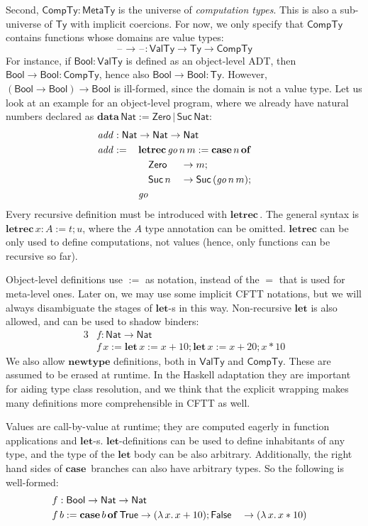 \documentclass[acmsmall,screen,review,anonymous]{acmart}
\newcommand{\mit}[1]{\mathit{#1}}
\newcommand{\msf}[1]{\mathsf{#1}}
\newcommand{\mbf}[1]{\mathbf{#1}}
\newcommand{\bs}[1]{\boldsymbol{#1}}
\newcommand{\ind}{\hspace{1em}}
\newcommand{\lam}{\lambda\,}
\newcommand{\data}{\mbf{data}\,}
\newcommand{\letrec}{\mbf{letrec}\,}
\newcommand{\of}{\mbf{of}\,}
\newcommand{\go}{\mit{go}}
\newcommand{\add}{\mit{add}}
\newcommand{\letdef}{\mbf{let\,}}
\newcommand{\Bool}{\msf{Bool}}
\newcommand{\case}{\mbf{case\,}}
\newcommand{\MTy}{\msf{MetaTy}}
\newcommand{\VTy}{\msf{ValTy}}
\newcommand{\Ty}{\msf{Ty}}
\newcommand{\CTy}{\msf{CompTy}}
\newcommand{\True}{\msf{True}}
\newcommand{\False}{\msf{False}}
\newcommand{\blank}{{\mathord{\hspace{1pt}\text{--}\hspace{1pt}}}}
\newcommand{\Nat}{\msf{Nat}}
\newcommand{\Zero}{\msf{Zero}}
\newcommand{\Suc}{\msf{Suc}}
\theoremstyle{remark}
\begin{document}
Second, $\bs{\CTy} : \MTy$ is the universe of \emph{computation types}. This is
also a sub-universe of $\Ty$ with implicit coercions. For now, we only specify
that $\CTy$ contains functions whose domains are value types:
\[ \blank\to\blank : \VTy \to \Ty \to \CTy \]
For instance, if $\Bool : \VTy$ is defined as an object-level ADT, then $\Bool
\to \Bool : \CTy$, hence also $\Bool \to \Bool : \Ty$. However, $(\Bool \to
\Bool) \to \Bool$ is ill-formed, since the domain is not a value type. Let us look at an
example for an object-level program, where we already have natural numbers
declared as $\data \Nat := \Zero\,|\,\Suc\,\Nat$:
\begin{alignat*}{3}
  &\hspace{-1em}\rlap{$\add : \Nat \to \Nat \to \Nat$}\\
  &\hspace{-1em}\add :=\,&& \mathrlap{\letrec \go\,n\,m := \case n\,\of}\\
  &\hspace{-1em}         && \ind \Zero   &&\to m;\\
  &\hspace{-1em}         && \ind \Suc\,n &&\to \Suc\,(\go\,n\,m);\\
  &\hspace{-1em}         && \go
\end{alignat*}
Every recursive definition must be introduced with $\letrec$. The general syntax
is $\letrec x : A := t; u$, where the $A$ type annotation can be
omitted. $\mbf{letrec}$ can be only used to define computations, not values
(hence, only functions can be recursive so far).

Object-level definitions use $:=$ as notation, instead of the $=$ that is used
for meta-level ones. Later on, we may use some implicit CFTT notations, but we
will always disambiguate the stages of $\mbf{let}$-s in this way. Non-recursive
$\mbf{let}$ is also allowed, and can be used to shadow binders:
\begin{alignat*}{3}
  &f : \Nat \to \Nat\\
  &f\,x := \letdef x := x + 10; \letdef x := x + 20; x * 10
\end{alignat*}
We also allow $\mbf{newtype}$ definitions, both in $\VTy$ and $\CTy$. These are
assumed to be erased at runtime. In the Haskell adaptation they are important
for aiding type class resolution, and we think that the explicit wrapping
makes many definitions more comprehensible in CFTT as well.

Values are call-by-value at runtime; they are computed eagerly in function
applications and $\mbf{let}$-s. $\mbf{let}$-definitions can be used to define
inhabitants of any type, and the type of the $\mbf{let}$ body can be also
arbitrary. Additionally, the right hand sides of $\case$ branches can also have
arbitrary types. So the following is well-formed:
\begin{alignat*}{3}
  &f : \mathrlap{\Bool \to \Nat \to \Nat}\\
  &f\,b := \case b\,\of \True \to (\lam x.\, x + 10); \False &&\to (\lam x.\, x * 10)
\end{alignat*}
\end{document}

